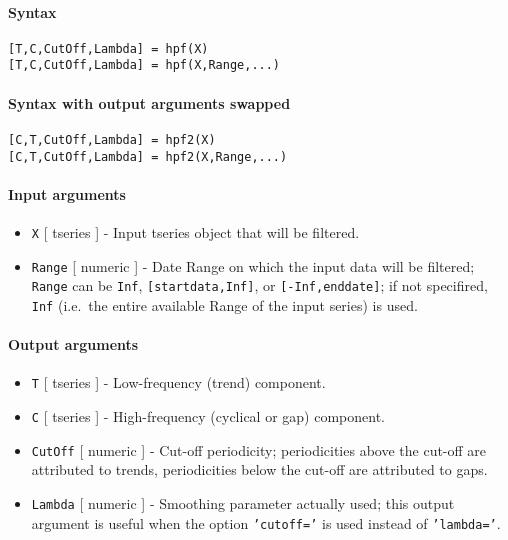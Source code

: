 


	\paragraph{Syntax}\label{syntax}

\begin{verbatim}
[T,C,CutOff,Lambda] = hpf(X)
[T,C,CutOff,Lambda] = hpf(X,Range,...)
\end{verbatim}

\paragraph{Syntax with output arguments
swapped}\label{syntax-with-output-arguments-swapped}

\begin{verbatim}
[C,T,CutOff,Lambda] = hpf2(X)
[C,T,CutOff,Lambda] = hpf2(X,Range,...)
\end{verbatim}

\paragraph{Input arguments}\label{input-arguments}

\begin{itemize}
\item
  \texttt{X} {[} tseries {]} - Input tseries object that will be
  filtered.
\item
  \texttt{Range} {[} numeric {]} - Date Range on which the input data
  will be filtered; \texttt{Range} can be \texttt{Inf},
  \texttt{{[}startdata,Inf{]}}, or \texttt{{[}-Inf,enddate{]}}; if not
  specifired, \texttt{Inf} (i.e.~the entire available Range of the input
  series) is used.
\end{itemize}

\paragraph{Output arguments}\label{output-arguments}

\begin{itemize}
\item
  \texttt{T} {[} tseries {]} - Low-frequency (trend) component.
\item
  \texttt{C} {[} tseries {]} - High-frequency (cyclical or gap)
  component.
\item
  \texttt{CutOff} {[} numeric {]} - Cut-off periodicity; periodicities
  above the cut-off are attributed to trends, periodicities below the
  cut-off are attributed to gaps.
\item
  \texttt{Lambda} {[} numeric {]} - Smoothing parameter actually used;
  this output argument is useful when the option \texttt{'cutoff='} is
  used instead of \texttt{'lambda='}.
\end{itemize}

